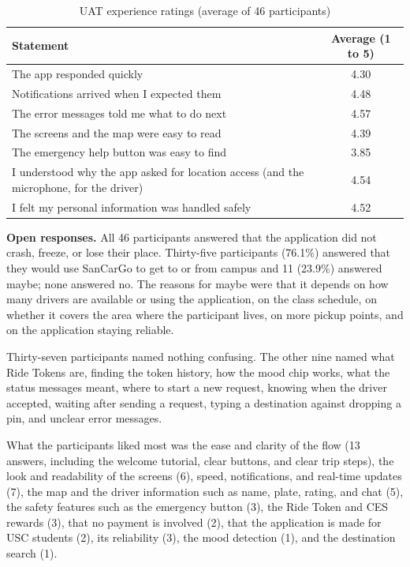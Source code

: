 \begin{table}[htbp]
    \centering
    \caption{UAT experience ratings (average of 46 participants)}\label{tab:uat-exp}
    \small
    \renewcommand{\arraystretch}{1.15}
    \begin{tabular}{|>{\raggedright\arraybackslash}p{}|c|}
        \hline
        \textbf{Statement} & \textbf{Average (1 to 5)} \\
        \hline
        The app responded quickly & 4.30 \\
        \hline
        Notifications arrived when I expected them & 4.48 \\
        \hline
        The error messages told me what to do next & 4.57 \\
        \hline
        The screens and the map were easy to read & 4.39 \\
        \hline
        The emergency help button was easy to find & 3.85 \\
        \hline
        I understood why the app asked for location access (and the microphone, for the driver) & 4.54 \\
        \hline
        I felt my personal information was handled safely & 4.52 \\
        \hline
    \end{tabular}
\end{table}

\textbf{Open responses.} All 46 participants answered that the application did not crash, freeze, or lose their place. Thirty-five participants (76.1\%) answered that they would use SanCarGo to get to or from campus and 11 (23.9\%) answered maybe; none answered no. The reasons for maybe were that it depends on how many drivers are available or using the application, on the class schedule, on whether it covers the area where the participant lives, on more pickup points, and on the application staying reliable.

Thirty-seven participants named nothing confusing. The other nine named what Ride Tokens are, finding the token history, how the mood chip works, what the status messages meant, where to start a new request, knowing when the driver accepted, waiting after sending a request, typing a destination against dropping a pin, and unclear error messages.

What the participants liked most was the ease and clarity of the flow (13 answers, including the welcome tutorial, clear buttons, and clear trip steps), the look and readability of the screens (6), speed, notifications, and real-time updates (7), the map and the driver information such as name, plate, rating, and chat (5), the safety features such as the emergency button (3), the Ride Token and CES rewards (3), that no payment is involved (2), that the application is made for USC students (2), its reliability (3), the mood detection (1), and the destination search (1).

